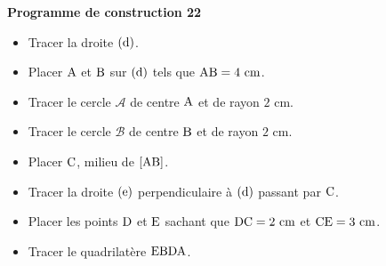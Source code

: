\documentclass[exercice,a4]{thedocument}%
\begin{document}
%
\noindent\textbf{Programme de construction 22}\par\smallskip\noindent
\begin{itemize}
    \item Tracer la droite $(\text{d})$.
    \item Placer $\text{A}$ et $\text{B}$ sur
    $(\text{d})$ tels que $\text{AB}=4\text{ cm}$.
    \item Tracer le cercle $\mathcal{A}$ de centre $\text{A}$ et de
    rayon $2\text{ cm}$.
    \item Tracer le cercle $\mathcal{B}$ de centre $\text{B}$ et de
    rayon $2\text{ cm}$.
    \item Placer $\text{C}$, milieu de $[\text{AB}]$.
    \item Tracer la droite $(\text{e})$ perpendiculaire à
    $(\text{d})$ passant par $\text{C}$.
    \item Placer les points $\text{D}$ et $\text{E}$ sachant
    que $\text{DC}=2\text{ cm}$ et $\text{CE}=3\text{ cm}$.
    \item Tracer le quadrilatère $\text{EBDA}$.
\end{itemize}
\end{document}
